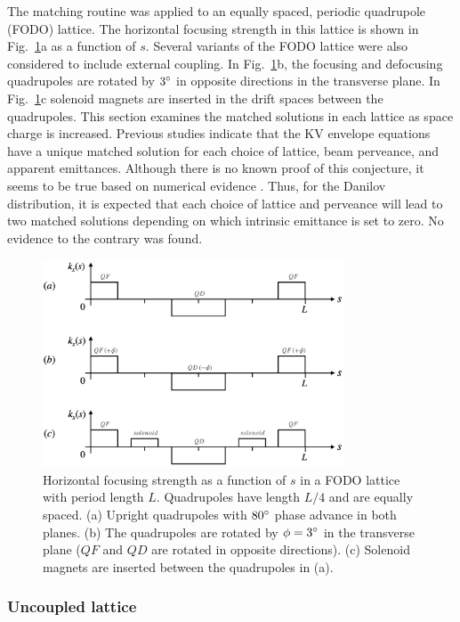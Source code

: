 The matching routine was applied to an equally spaced, periodic quadrupole (FODO) lattice. The horizontal focusing strength in this lattice is shown in Fig.~\ref{fig:fodo_lattices}a as a function of $s$. Several variants of the FODO lattice were also considered to include external coupling. In Fig.~\ref{fig:fodo_lattices}b, the focusing and defocusing quadrupoles are rotated by $3\degree$ in opposite directions in the transverse plane. In Fig.~\ref{fig:fodo_lattices}c solenoid magnets are inserted in the drift spaces between the quadrupoles. This section examines the matched solutions in each lattice as space charge is increased. Previous studies indicate that the KV envelope equations have a unique matched solution for each choice of lattice, beam perveance, and apparent emittances. Although there is no known proof of this conjecture, it seems to be true based on numerical evidence \cite{Lund2006}. Thus, for the Danilov distribution, it is expected that each choice of lattice and perveance will lead to two matched solutions depending on which intrinsic emittance is set to zero. No evidence to the contrary was found.
%
\begin{figure}[!p]
    \centering
    \includegraphics[width=0.8\textwidth]{Images/chapter2/fodo_lattices.png}
    \caption{Horizontal focusing strength as a function of $s$ in a FODO lattice with period length $L$. Quadrupoles have length $L/4$ and are equally spaced. (a) Upright quadrupoles with $80\degree$ phase advance in both planes. (b) The quadrupoles are rotated by $\phi = 3\degree$ in the transverse plane ($QF$ and $QD$ are rotated in opposite directions). (c) Solenoid magnets are inserted between the quadrupoles in (a).}
    \label{fig:fodo_lattices}
\end{figure}


\subsubsection{Uncoupled lattice}

